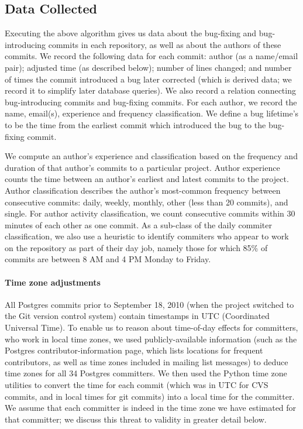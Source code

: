 \subsection{Data Collected}
\label{sec:data}
Executing the above algorithm gives us data about the bug-fixing
and bug-introducing commits
in each repository, as well as about the authors of these commits.  We
record the following data for each commit: author (as a name/email
pair); adjusted time (as described below); number of lines changed; 
and number of times the
commit introduced a bug later corrected (which is derived data; we
record it to simplify later database queries). We also record a
relation connecting bug-introducing commits and bug-fixing
commits. For each author, we record the name, email(s), experience and
frequency classification. We define a bug lifetime's to be the time from the
earliest commit which introduced the bug to the bug-fixing commit.

We compute an author's experience and classification based on the
frequency and duration of that author's commits to a particular
project. Author experience counts the time between an author's
earliest and latest commits to the project. Author classification
describes the author's most-common frequency between consecutive
commits: daily, weekly, monthly, other (less than 20 commits), and
single. For author activity classification, we count consecutive
commits within 30 minutes of each other as one commit. As a sub-class
of the daily commiter classification, we also use a heuristic to
identify commiters who appear to work on the repository as part of
their day job, namely those for which 85\% of commits are between 8 AM
and 4 PM Monday to Friday.

\paragraph{Time zone adjustments}
All Postgres commits prior to September 18, 2010 (when the project
switched to the Git version control system) contain timestamps in UTC
(Coordinated Universal Time). To enable us to reason about time-of-day
effects for committers, who work in local time zones, we used
publicly-available information (such as the Postgres
contributor-information page, which lists locations for frequent
contributors, as well as time zones included in mailing list messages) to deduce
time zones for all 34 Postgres committers. We then used the Python
time zone utilities to convert the time for each commit (which was in
UTC for CVS commits, and in local times for git commits) into a local
time for the committer. We assume that each committer is indeed in
the time zone we have estimated for that committer; 
we discuss this threat to validity in greater detail below.

